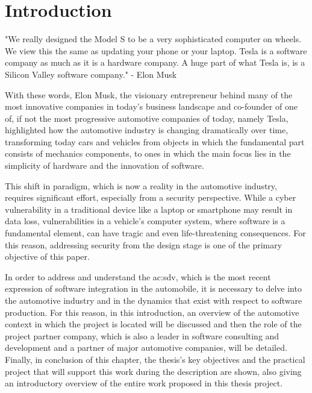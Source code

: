 \hypersetup{
    colorlinks=true,
    linkcolor=blue
}

\chapter{Introduction} \label{ch:introduction}
\begin{center}
  "We really designed the Model S to be a very sophisticated computer on wheels. We view this the same as updating your phone or your laptop. Tesla is a software company as much as it is a hardware company. A huge part of what Tesla is, is a Silicon Valley software company."
  - Elon Musk \cite{ElonMusk}
\end{center}
With these words, Elon Musk, the visionary entrepreneur behind many of the most innovative companies in today's business landscape and co-founder of one of, if not the most progressive automotive companies of today, namely Tesla, highlighted how the automotive industry is changing dramatically over time, transforming today cars and vehicles from objects in which the fundamental part consists of mechanics components, to ones in which the main focus lies in the simplicity of hardware and the innovation of software.

This shift in paradigm, which is now a reality in the automotive industry, requires significant effort, especially from a security perspective. While a cyber vulnerability in a traditional device like a laptop or smartphone may result in data loss, vulnerabilities in a vehicle's computer system, where software is a fundamental element, can have tragic and even life-threatening consequences. For this reason, addressing security from the design stage is one of the primary objective of this paper.

In order to address and understand the \gls{ac:sdv}, which is the most recent expression of software integration in the automobile, it is necessary to delve into the automotive industry and in the dynamics that exist with respect to software production. For this reason, in this introduction, an overview of the automotive context in which the project is located will be discussed and then the role of the project partner company, which is also a leader in software consulting and development and a partner of major automotive companies, will be detailed. Finally, in conclusion of this chapter, the thesis's key objectives and the practical project that will support this work during the description are shown, also giving an introductory overview of the entire work proposed in this thesis project.

